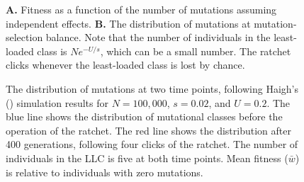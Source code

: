 \documentclass[
  letterpaper,
]{book}
\begin{document}
\begin{figure}


\caption[Fitness as a function of the number of mutations assuming
independent effects \& The distribution of mutations at
mutation-selection balance]{\label{fig-6-1}\textbf{A.} Fitness as a
function of the number of mutations assuming independent effects.
\textbf{B.} The distribution of mutations at mutation-selection balance.
Note that the number of individuals in the least-loaded class is
\(Ne^{-U/s}\), which can be a small number. The ratchet clicks whenever
the least-loaded class is lost by chance.}

\end{figure}%

\begin{figure}


\caption[The distribution of mutations at two time points following
Haigh's simulation results]{\label{fig-6-2}The distribution of mutations
at two time points, following Haigh's ()
simulation results for \(N = 100,000\), \(s = 0.02\), and \(U = 0.2\).
The blue line shows the distribution of mutational classes before the
operation of the ratchet. The red line shows the distribution after 400
generations, following four clicks of the ratchet. The number of
individuals in the LLC is five at both time points. Mean fitness
(\(\bar{w}\)) is relative to individuals with zero mutations.}

\end{figure}%
\end{document}
